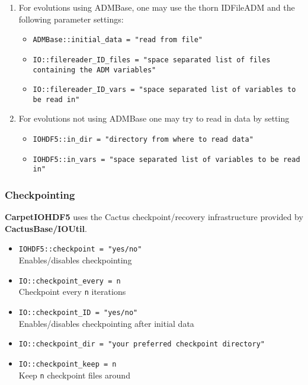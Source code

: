 \begin{enumerate}
  \item For evolutions using ADMBase, one may use the thorn IDFileADM and the following parameter settings:
    \begin{itemize}
      \item {\tt ADMBase::initial\_data  = "read from file"}
      \item {\tt IO::filereader\_ID\_files = "space separated list of files containing the ADM variables"}
      \item {\tt IO::filereader\_ID\_vars = "space separated list of variables to be read in"}
    \end{itemize}
  \item For evolutions not using ADMBase one may try to read in data by setting
    \begin{itemize}
      \item {\tt IOHDF5::in\_dir = "directory from where to read data"}
      \item {\tt IOHDF5::in\_vars = "space separated list of variables to be read in"}
    \end{itemize}
\end{enumerate}


\subsubsection{Checkpointing}

{\bf CarpetIOHDF5} uses the Cactus checkpoint/recovery infrastructure provided
by {\bf CactusBase/IOUtil}.

\begin{itemize}
  \item {\tt IOHDF5::checkpoint = "yes/no"}\\
        Enables/disables checkpointing
  \item {\tt IO::checkpoint\_every = n}\\
        Checkpoint every {\tt n} iterations
  \item {\tt IO::checkpoint\_ID = "yes/no"}\\
        Enables/disables checkpointing after initial data
  \item {\tt IO::checkpoint\_dir = "your preferred checkpoint directory"} 
  \item {\tt IO::checkpoint\_keep = n}\\
        Keep {\tt n} checkpoint files around
\end{itemize}



